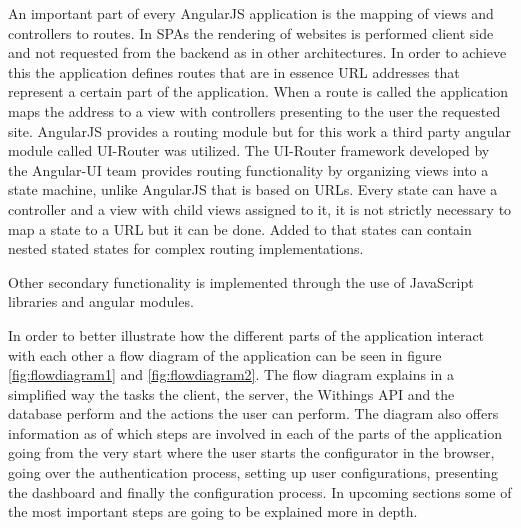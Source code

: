 \documentclass[../medieninformatik-arbeit.tex]{subfiles}
\begin{document}
An important part of every AngularJS application is the mapping of views and controllers to routes. In SPAs the rendering of websites is performed client side and not requested from the backend as in other architectures. In order to achieve this the application defines routes that are in essence URL addresses that represent a certain part of the application. When a route is called the application maps the address to a view with controllers presenting to the user the requested site. AngularJS provides a routing module but for this work a third party angular module called UI-Router was utilized. The UI-Router framework developed by the Angular-UI team\cite{ui-router} provides routing functionality by organizing views into a state machine, unlike AngularJS that is based on URLs. Every state can have a controller and a view with child views assigned to it, it is not strictly necessary to map a state to a URL but it can be done. Added to that states can contain nested stated states for complex routing implementations. 

Other secondary functionality is implemented through the use of JavaScript libraries and angular modules. 

In order to better illustrate how the different parts of the application interact with each other a flow diagram of the application can be seen in figure \ref{fig:flowdiagram1} and \ref{fig:flowdiagram2}. The flow diagram explains in a simplified way the tasks the client, the server, the Withings API and the database perform and the actions the user can perform. The diagram also offers information as of which steps are involved in each of the parts of the application going from the very start where the user starts the configurator in the browser, going over the authentication process, setting up user configurations, presenting the dashboard and finally the configuration process. In upcoming sections some of the most important steps are going to be explained more in depth.
\end{document}
